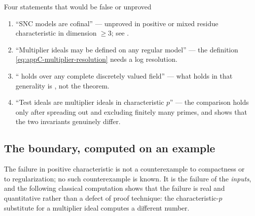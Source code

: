 \begin{warning}{Four statements that would be false or unproved}
\begin{enumerate}
\item ``SNC models are cofinal'' --- unproved in positive or mixed residue
characteristic in dimension \(\geq3\); see .
\item ``Multiplier ideals may be defined on any regular model'' --- the
definition \eqref{eq:appC-multiplier-resolution} needs a log resolution.
\item `` holds over any complete
discretely valued field'' --- what holds in that generality is
, not the theorem.
\item ``Test ideals are multiplier ideals in characteristic \(p\)'' --- the
comparison  holds only after spreading out and
excluding finitely many primes, and
 shows that the two invariants genuinely differ.
\end{enumerate}
\end{warning}

\subsection{The boundary, computed on an example}

The failure in positive characteristic is not a counterexample to
compactness or to regularization; no such counterexample is known.  It is
the failure of the \emph{inputs}, and the following classical computation
shows that the failure is real and quantitative rather than a defect of
proof technique: the characteristic-\(p\) substitute for a multiplier ideal
computes a different number.

